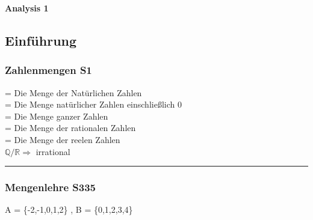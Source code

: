 \documentclass[6pt,a4paper]{scrartcl}
\begin{document}

\begin{multicols*}{2}

\parbox{4cm}{
	\huge{\textbf{Analysis 1}}
}
\subsection{Einführung} %


\subsubsection{Zahlenmengen \color{red} S1} %
\color{black}
\label{sub:allgemeines}

 =    Die Menge der Natürlichen Zahlen\\
   =   Die Menge natürlicher Zahlen einschließlich 0 \\
 =   Die Menge ganzer Zahlen\\
 =   Die Menge der rationalen Zahlen\\
 = \makebox[4cm]{}   Die Menge der reelen Zahlen\\
$\mathbb Q / \mathbb R \Rightarrow$ irrational
\hrule

\subsubsection{Mengenlehre \color{red} S335} %
\color{black}
\label{sub:allgemeines}
A = \{-2,-1,0,1,2\} , B = \{0,1,2,3,4\}\\

\begin{tabulary}{12cm}{LLL}
	

\end{tabulary}
\end{multicols*}
\end{document}
